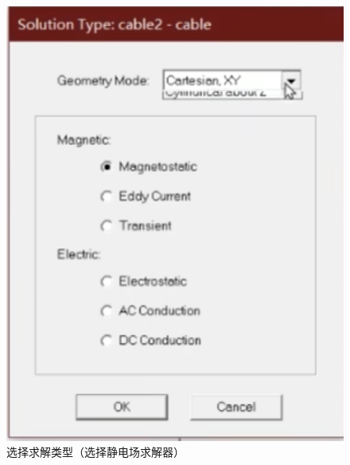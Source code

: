 \documentclass{article}
\begin{document}
          \begin{figure}[H]
            \centering
            \includegraphics[width=12cm]{img/13.png}
          \caption[]{选择求解类型（选择静电场求解器）}  

          \end{figure}
\end{document}
